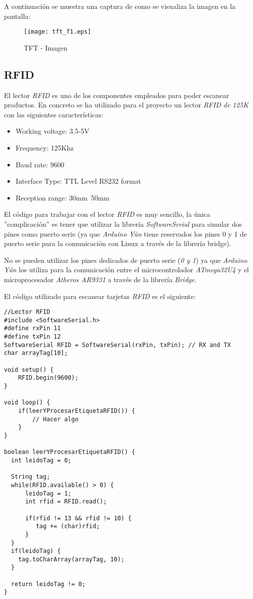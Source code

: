A continuación se muestra una captura de como se visualiza la imagen en la pantalla:

\begin{figure}[H]
    \centering
    \texttt{[image: tft\_f1.eps]}
    \caption{TFT - Imagen}\label{fig:tft_f1}
\end{figure}

\subsection{RFID}


El lector \emph{RFID} es uno de los componentes empleados para poder escanear productos. En concreto se ha utilizado para el proyecto un lector \emph{RFID de 125K} con las siguientes características:

\begin{itemize}
    \item Working voltage: 3.5-5V
    \item Frequency: 125Khz
    \item Baud rate: 9600
    \item Interface Type: TTL Level RS232 format
    \item Reception range: 30mm~50mm
\end{itemize}

El código para trabajar con el lector \emph{RFID} es muy sencillo, la única ''complicación'' es tener que utilizar la librería \emph{SoftwareSerial} para simular dos pines como puerto serie (ya que \emph{Arduino Yún} tiene reservados los pines 0 y 1 de puerto serie para la comunicación con Linux a través de la librería bridge).

No se pueden utilizar los pines dedicados de puerto serie (\emph{0 y 1}) ya que \emph{Arduino Yún} los utiliza para la comunicación entre el microcontrolador \emph{ATmega32U4} y el microprocesador \emph{Atheros AR9331} a través de la librería \emph{Bridge}.

El código utilizado para escanear tarjetas \emph{RFID} es el siguiente:

\begin{lstlisting}
//Lector RFID
#include <SoftwareSerial.h>
#define rxPin 11
#define txPin 12
SoftwareSerial RFID = SoftwareSerial(rxPin, txPin); // RX and TX
char arrayTag[10];

void setup() {
    RFID.begin(9600);
}

void loop() {
    if(leerYProcesarEtiquetaRFID()) {
        // Hacer algo
    }
}

boolean leerYProcesarEtiquetaRFID() {
  int leidoTag = 0;

  String tag;
  while(RFID.available() > 0) {
      leidoTag = 1;
      int rfid = RFID.read();

      if(rfid != 13 && rfid != 10) {
         tag += (char)rfid;
      }
  }
  if(leidoTag) {
    tag.toCharArray(arrayTag, 10);
  }

  return leidoTag != 0;
}
\end{lstlisting}

